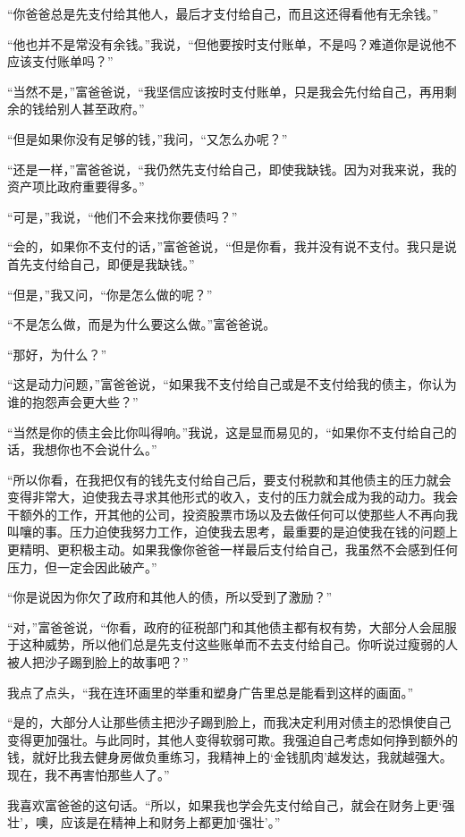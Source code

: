 “你爸爸总是先支付给其他人，最后才支付给自己，而且这还得看他有无余钱。”

“他也并不是常没有余钱。”我说，“但他要按时支付账单，不是吗？难道你是说他不应该支付账单吗？”

“当然不是，”富爸爸说，“我坚信应该按时支付账单，只是我会先付给自己，再用剩余的钱给别人甚至政府。”

“但是如果你没有足够的钱，”我问，“又怎么办呢？”

“还是一样，”富爸爸说，“我仍然先支付给自己，即使我缺钱。因为对我来说，我的资产项比政府重要得多。”

“可是，”我说，“他们不会来找你要债吗？”

“会的，如果你不支付的话，”富爸爸说，“但是你看，我并没有说不支付。我只是说首先支付给自己，即便是我缺钱。”

“但是，”我又问，“你是怎么做的呢？”

“不是怎么做，而是为什么要这么做。”富爸爸说。

“那好，为什么？”

“这是动力问题，”富爸爸说，“如果我不支付给自己或是不支付给我的债主，你认为谁的抱怨声会更大些？”

“当然是你的债主会比你叫得响。”我说，这是显而易见的，“如果你不支付给自己的话，我想你也不会说什么。”

“所以你看，在我把仅有的钱先支付给自己后，要支付税款和其他债主的压力就会变得非常大，迫使我去寻求其他形式的收入，支付的压力就会成为我的动力。我会干额外的工作，开其他的公司，投资股票市场以及去做任何可以使那些人不再向我叫嚷的事。压力迫使我努力工作，迫使我去思考，最重要的是迫使我在钱的问题上更精明、更积极主动。如果我像你爸爸一样最后支付给自己，我虽然不会感到任何压力，但一定会因此破产。”

“你是说因为你欠了政府和其他人的债，所以受到了激励？”

“对，”富爸爸说，“你看，政府的征税部门和其他债主都有权有势，大部分人会屈服于这种威势，所以他们总是先支付这些账单而不去支付给自己。你听说过瘦弱的人被人把沙子踢到脸上的故事吧？”

我点了点头，“我在连环画里的举重和塑身广告里总是能看到这样的画面。”

“是的，大部分人让那些债主把沙子踢到脸上，而我决定利用对债主的恐惧使自己变得更加强壮。与此同时，其他人变得软弱可欺。我强迫自己考虑如何挣到额外的钱，就好比我去健身房做负重练习，我精神上的‘金钱肌肉’越发达，我就越强大。现在，我不再害怕那些人了。”

我喜欢富爸爸的这句话。“所以，如果我也学会先支付给自己，就会在财务上更‘强壮’，噢，应该是在精神上和财务上都更加‘强壮’。”

